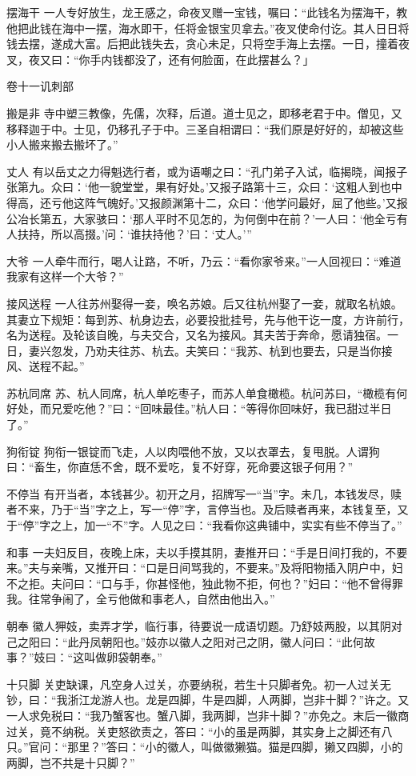 \documentclass[12pt,UTF8]{ctexbook}
\begin{document}
摆海干
一人专好放生，龙王感之，命夜叉赠一宝钱，嘱曰：“此钱名为摆海干，教他把此钱在海中一摆，海水即干，任将金银宝贝拿去。”夜叉使命付讫。其人日日将钱去摆，遂成大富。后把此钱失去，贪心未足，只将空手海上去摆。一日，撞着夜叉，夜又曰：“你手内钱都没了，还有何脸面，在此摆甚么？」

卷十一讥刺部

搬是非
寺中塑三教像，先儒，次释，后道。道士见之，即移老君于中。僧见，又移释迦于中。士见，仍移孔子于中。三圣自相谓曰：“我们原是好好的，却被这些小人搬来搬去搬坏了。”

丈人
有以岳丈之力得魁选行者，或为语嘲之曰：“孔门弟子入试，临揭晓，闻报子张第九。众曰：‘他一貌堂堂，果有好处。’又报子路第十三，众曰：‘这粗人到也中得高，还亏他这阵气魄好。’又报颜渊第十二，众曰：‘他学问最好，屈了他些。’又报公冶长第五，大家骇曰：‘那人平时不见怎的，为何倒中在前？’一人曰：‘他全亏有人扶持，所以高掇。’问：‘谁扶持他？’曰：‘丈人。’”

大爷
一人牵牛而行，喝人让路，不听，乃云：“看你家爷来。”一人回视曰：“难道我家有这样一个大爷？”

接风送程
一人往苏州娶得一妾，唤名苏娘。后又往杭州娶了一妾，就取名杭娘。其妻立下规矩：每到苏、杭身边去，必要投批挂号，先与他干讫一度，方许前行，名为送程。及轮该自晚，与夫交合，又名为接风。其夫苦于奔命，愿请独宿。一日，妻兴忽发，乃劝夫往苏、杭去。夫笑曰：“我苏、杭到也要去，只是当你接风、送程不起。”

苏杭同席
苏、杭人同席，杭人单吃枣子，而苏人单食橄榄。杭问苏曰，“橄榄有何好处，而兄爱吃他？”曰：“回味最佳。”杭人曰：“等得你回味好，我已甜过半日了。”

狗衔锭
狗衔一银锭而飞走，人以肉喂他不放，又以衣罩去，复甩脱。人谓狗曰：“畜生，你直恁不舍，既不爱吃，复不好穿，死命要这银子何用？”

不停当
有开当者，本钱甚少。初开之月，招牌写一“当”字。未几，本钱发尽，赎者不来，乃于“当”字之上，写一“停”字，言停当也。及后赎者再来，本钱复至，又于“停”字之上，加一“不”字。人见之曰：“我看你这典铺中，实实有些不停当了。”

和事
一夫妇反目，夜晚上床，夫以手摸其阴，妻推开曰：“手是日间打我的，不要来。”夫与亲嘴，又推开曰：“口是日间骂我的，不要来。”及将阳物插入阴户中，妇不之拒。夫问曰：“口与手，你甚怪他，独此物不拒，何也？”妇曰：“他不曾得罪我。往常争闹了，全亏他做和事老人，自然由他出入。”

朝奉
徽人狎妓，卖弄才学，临行事，待要说一成语切题。乃舒妓两股，以其阴对己之阳曰：“此丹凤朝阳也。”妓亦以徽人之阳对己之阴，徽人问曰：“此何故事？”妓曰：“这叫做卵袋朝奉。”

十只脚
关吏缺课，凡空身人过关，亦要纳税，若生十只脚者免。初一人过关无钞，曰：“我浙江龙游人也。龙是四脚，牛是四脚，人两脚，岂非十脚？”许之。又一人求免税曰：“我乃蟹客也。蟹八脚，我两脚，岂非十脚？”亦免之。末后一徽商过关，竟不纳税。关吏怒欲责之，答曰：“小的虽是两脚，其实身上之脚还有八只。”官问：“那里？”答曰：“小的徽人，叫做徽獭猫。猫是四脚，獭又四脚，小的两脚，岂不共是十只脚？”
\end{document}

